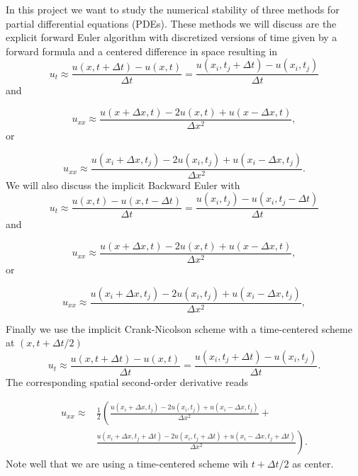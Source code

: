 \documentclass[%
oneside,                 %
final,                   %
10pt]{article}
\begin{document}
In this project we want to study the numerical stability of three methods for partial differential equations
(PDEs). 
These methods we will discuss are
the explicit forward Euler algorithm with discretized versions of time given by a forward formula and a centered difference in space resulting in   
\begin{equation*} 
u_t\approx \frac{u(x,t+\Delta t)-u(x,t)}{\Delta t}=\frac{u(x_i,t_j+\Delta t)-u(x_i,t_j)}{\Delta t}
\end{equation*}
and

\begin{equation*}
u_{xx}\approx \frac{u(x+\Delta x,t)-2u(x,t)+u(x-\Delta x,t)}{\Delta x^2},
\end{equation*}
or

\begin{equation*}
u_{xx}\approx \frac{u(x_i+\Delta x,t_j)-2u(x_i,t_j)+u(x_i-\Delta x,t_j)}{\Delta x^2}.
\end{equation*}
We will also discuss the implicit Backward Euler with   
\begin{equation*} 
u_t\approx \frac{u(x,t)-u(x,t-\Delta t)}{\Delta t}=\frac{u(x_i,t_j)-u(x_i,t_j-\Delta t)}{\Delta t}
\end{equation*}
and

\begin{equation*}
u_{xx}\approx \frac{u(x+\Delta x,t)-2u(x,t)+u(x-\Delta x,t)}{\Delta x^2},
\end{equation*}
or

\begin{equation*}
u_{xx}\approx \frac{u(x_i+\Delta x,t_j)-2u(x_i,t_j)+u(x_i-\Delta x,t_j)}{\Delta x^2},
\end{equation*}

Finally we use the implicit Crank-Nicolson scheme with  a time-centered scheme at $(x,t+\Delta t/2)$   
\begin{equation*} 
u_t\approx \frac{u(x,t+\Delta t)-u(x,t)}{\Delta t}=\frac{u(x_i,t_j+\Delta t)-u(x_i,t_j)}{\Delta t}.
\end{equation*}
The corresponding spatial second-order derivative reads

\begin{align*}
u_{xx}\approx &\frac{1}{2}\left(\frac{u(x_i+\Delta x,t_j)-2u(x_i,t_j)+u(x_i-\Delta x,t_j)}{\Delta x^2}\right. +\\
&\left. \frac{u(x_i+\Delta x,t_j+\Delta t)-2u(x_i,t_j+\Delta t)+u(x_i-\Delta x,t_j+\Delta t)}{\Delta x^2}\right).
\end{align*}
Note well that we are using a time-centered scheme wih $t+\Delta t/2$ as center.
\end{document}
